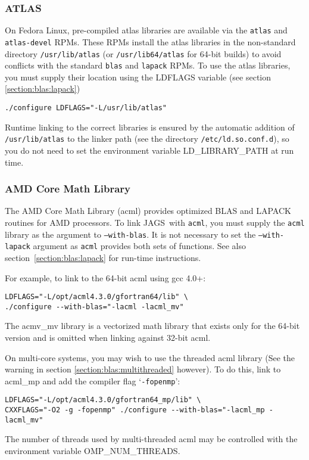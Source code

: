 \documentclass[11pt, a4paper, titlepage]{article}
\newcommand{\JAGS}{\textsf{JAGS}}
\newcommand{\code}[1]{{\bgroup{\normalfont\ttfamily #1}\egroup}}
\newcommand{\samp}[1]{{`\bgroup\normalfont\texttt{#1}'\egroup}}
\let\option=\samp
\begin{document}
\subsubsection{ATLAS}

On Fedora Linux, pre-compiled atlas libraries are available via the
\texttt{atlas} and \texttt{atlas-devel} RPMs.  These RPMs install the
atlas libraries in the non-standard directory \texttt{/usr/lib/atlas}
(or \texttt{/usr/lib64/atlas} for 64-bit builds) to avoid conflicts
with the standard \texttt{blas} and \texttt{lapack} RPMs. To use the
atlas libraries, you must supply their location using the
\code{LDFLAGS} variable (see section \ref{section:blas:lapack})
\begin{verbatim}
./configure LDFLAGS="-L/usr/lib/atlas"
\end{verbatim}
Runtime linking to the correct libraries is ensured by the automatic
addition of \texttt{/usr/lib/atlas} to the linker path (see the directory
\texttt{/etc/ld.so.conf.d}), so you do not need to set the
environment variable \code{LD\_LIBRARY\_PATH} at run time.

\subsubsection{AMD Core Math Library}
\label{section:acml:linux}

The AMD Core Math Library (acml) provides optimized BLAS and LAPACK
routines for AMD processors. To link \JAGS\ with \texttt{acml}, you must
supply the \texttt{acml} library as the argument to \texttt{--with-blas}.
It is not necessary to set the \texttt{--with-lapack} argument
as \texttt{acml} provides both sets of functions. See also
section~\ref{section:blas:lapack} for run-time instructions.

For example, to link to the 64-bit acml using gcc 4.0+:
\begin{verbatim}
LDFLAGS="-L/opt/acml4.3.0/gfortran64/lib" \
./configure --with-blas="-lacml -lacml_mv" 
\end{verbatim}
The \code{acmv\_mv} library is a vectorized math library that
exists only for the 64-bit version and is omitted when linking against
32-bit acml.

On multi-core systems, you may wish to use the threaded acml library
(See the warning in section \ref{section:blas:multithreaded} however).
To do this, link to \code{acml\_mp} and add the compiler flag
\option{-fopenmp}:
\begin{verbatim}
LDFLAGS="-L/opt/acml4.3.0/gfortran64_mp/lib" \
CXXFLAGS="-O2 -g -fopenmp" ./configure --with-blas="-lacml_mp -lacml_mv" 
\end{verbatim}
The number of threads used by multi-threaded acml may be controlled
with the environment variable \code{OMP\_NUM\_THREADS}.
\end{document}
